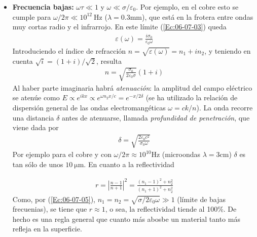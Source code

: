\begin{itemize}
	\item \textbf{Frecuencia bajas:} $\omega \tau \ll 1$ y $\omega \ll \sigma / \varepsilon_0$. Por ejemplo, en el cobre esto se cumple para $\omega/2\pi\ll 10^{12} \ \unit{\Hz}$ ($\lambda = 0.3\unit{\mm}$), que está en la frotera entre ondas muy cortas radio y el infrarrojo. En este límite (\ref{Ec:06-07-03}) queda 
	\begin{eqnarray}
		\varepsilon(\omega) = \frac{i\sigma_0}{\varepsilon_0 \omega}
	\end{eqnarray}
	Introduciendo el índice de refracción $n=\sqrt{\varepsilon(\omega)}=n_1 + i n_2$, y teniendo en cuenta $\sqrt{i}=(1+i)/\sqrt{2}$, resulta
	\begin{eqnarray}
		n = \sqrt{\frac{\sigma_0}{2\varepsilon_0\sigma}} (1+i) \label{Ec:06-07-05}
	\end{eqnarray}
	Al haber parte imaginaria habrá \textit{atenuación}: la amplitud del campo eléctrico se atenúe como $E\propto e^{ikx} \propto e^{\omega n_2 x/c} = e^{-x/2\delta}$ (se ha utilizado la relación de dispersión general de las ondas electromangéticas $\omega = ck /n$). La onda recorre una distancia $\delta$ antes de atenuarse, llamada \textit{profundidad de penetración}, que viene dada por 
	\begin{eqnarray}
		\delta = \sqrt{\frac{2\varepsilon_0 c^2}{\sigma_0 \omega}}
	\end{eqnarray}
	Por ejemplo para el cobre y con $\omega/2\pi \approx 10^{10} \unit{\Hz}$ (microondas $\lambda=3\unit{\cm}$) $\delta$ es tan sólo de unos $10 \ \unit{\um}$. En cuanto a la reflectividad 
	
	\begin{eqnarray}
		r = \left| \frac{n-1}{n+1} \right|^2 = \frac{(n_1-1)^2 + n_2^2}{(n_1+1)^2+n_2^2} \label{Ec:06-07-07}
	\end{eqnarray}
	Como, por (\ref{Ec:06-07-05}), $n_1 = n_2 = \sqrt{\sigma / 2\varepsilon_0 \omega} \gg 1$ (límite de bajas frecuenias), se tiene que $r\approx 1$, o sea, la reflectividad tiende al 100\%. De hecho es una regla general que cuanto más abosbe un material tanto más refleja en la superficie.
	

\end{itemize}
